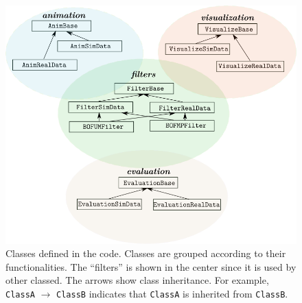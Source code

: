 \begin{figure}[hp]
  \centering
    \includegraphics[width=\textwidth]{figures/classes.png}
    \caption[Classes defined in the code.]{Classes defined in the code. Classes are grouped according to their functionalities. The ``filters'' is shown in the center since it is used by other classed. The arrows show class inheritance. For example, \texttt{ClassA} $\rightarrow$ \texttt{ClassB} indicates that \texttt{ClassA} is inherited from \texttt{ClassB}. }
    \label{fig:classes}
\end{figure}

